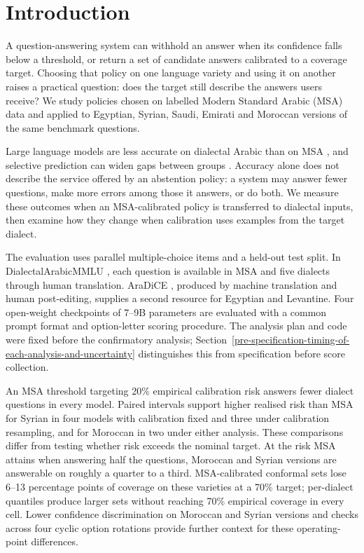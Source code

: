 \documentclass[applsci,article,submit,pdftex,oneauthor]{Definitions/mdpi}
\begin{document}
\hypertarget{introduction}{%
\section{Introduction}\label{introduction}}

A question-answering system can withhold an answer when its confidence falls below a threshold, or return a set of candidate answers calibrated to a coverage target. Choosing that policy on one language variety and using it on another raises a practical question: does the target still describe the answers users receive? We study policies chosen on labelled Modern Standard Arabic (MSA) data and applied to Egyptian, Syrian, Saudi, Emirati and Moroccan versions of the same benchmark questions.

Large language models are less accurate on dialectal Arabic than on MSA \cite{altakrori2026dialectalarabicmmlu, mousi2025aradice}, and selective prediction can widen gaps between groups \cite{jones2021selective}. Accuracy alone does not describe the service offered by an abstention policy: a system may answer fewer questions, make more errors among those it answers, or do both. We measure these outcomes when an MSA-calibrated policy is transferred to dialectal inputs, then examine how they change when calibration uses examples from the target dialect.

The evaluation uses parallel multiple-choice items and a held-out test split. In DialectalArabicMMLU \cite{altakrori2026dialectalarabicmmlu}, each question is available in MSA and five dialects through human translation. AraDiCE \cite{mousi2025aradice}, produced by machine translation and human post-editing, supplies a second resource for Egyptian and Levantine. Four open-weight checkpoints of 7--9B parameters are evaluated with a common prompt format and option-letter scoring procedure. The analysis plan and code were fixed before the confirmatory analysis; Section~\ref{pre-specification-timing-of-each-analysis-and-uncertainty} distinguishes this from specification before score collection.

An MSA threshold targeting 20\% empirical calibration risk answers fewer dialect questions in every model. Paired intervals support higher realised risk than MSA for Syrian in four models with calibration fixed and three under calibration resampling, and for Moroccan in two under either analysis. These comparisons differ from testing whether risk exceeds the nominal target. At the risk MSA attains when answering half the questions, Moroccan and Syrian versions are answerable on roughly a quarter to a third. MSA-calibrated conformal sets lose 6--13 percentage points of coverage on these varieties at a 70\% target; per-dialect quantiles produce larger sets without reaching 70\% empirical coverage in every cell. Lower confidence discrimination on Moroccan and Syrian versions and checks across four cyclic option rotations provide further context for these operating-point differences.
\end{document}
